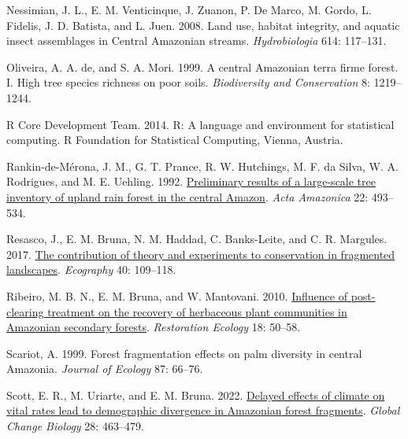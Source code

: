 \documentclass[
  man, donotrepeattitle,floatsintext]{apa6}
\newlength{\cslhangindent}
\newlength{\cslentryspacingunit} %
\newenvironment{CSLReferences}[2] %
 {%
  \setlength{\parindent}{0pt}
  \ifodd #1
  \let\oldpar\par
  \def\par{\hangindent=\cslhangindent\oldpar}
  \fi
  \setlength{\parskip}{#2\cslentryspacingunit}
 }%
 {}
\begin{document}
\begin{CSLReferences}{1}{0}
\leavevmode{}%
Nessimian, J. L., E. M. Venticinque, J. Zuanon, P. De Marco, M. Gordo, L. Fidelis, J. D. Batista, and L. Juen. 2008. Land use, habitat integrity, and aquatic insect assemblages in {Central} {Amazonian} streams. \emph{Hydrobiologia} 614: 117--131.

\leavevmode{}%
Oliveira, A. A. de, and S. A. Mori. 1999. A central {Amazonian} terra firme forest. {I}. {High} tree species richness on poor soils. \emph{Biodiversity and Conservation} 8: 1219--1244.

\leavevmode{}%
R Core Development Team. 2014. R: {A} language and environment for statistical computing. R Foundation for Statistical Computing, Vienna, Austria.

\leavevmode{}%
Rankin-de-Mérona, J. M., G. T. Prance, R. W. Hutchings, M. F. da Silva, W. A. Rodrigues, and M. E. Uehling. 1992. \href{https://doi.org/10.1590/1809-43921992224534}{Preliminary results of a large-scale tree inventory of upland rain forest in the central {Amazon}}. \emph{Acta Amazonica} 22: 493--534.

\leavevmode{}%
Resasco, J., E. M. Bruna, N. M. Haddad, C. Banks-Leite, and C. R. Margules. 2017. \href{https://doi.org/10.1111/ecog.02546}{The contribution of theory and experiments to conservation in fragmented landscapes}. \emph{Ecography} 40: 109--118.

\leavevmode{}%
Ribeiro, M. B. N., E. M. Bruna, and W. Mantovani. 2010. \href{https://doi.org/10.1111/j.1526-100X.2010.00715.x}{Influence of post-clearing treatment on the recovery of herbaceous plant communities in {Amazonian} secondary forests}. \emph{Restoration Ecology} 18: 50--58.

\leavevmode{}%
Scariot, A. 1999. Forest fragmentation effects on palm diversity in central {Amazonia}. \emph{Journal of Ecology} 87: 66--76.

\leavevmode{}%
Scott, E. R., M. Uriarte, and E. M. Bruna. 2022. \href{https://doi.org/10.1111/gcb.15900}{Delayed effects of climate on vital rates lead to demographic divergence in {Amazonian} forest fragments}. \emph{Global Change Biology} 28: 463--479.


\end{CSLReferences}
\end{document}
